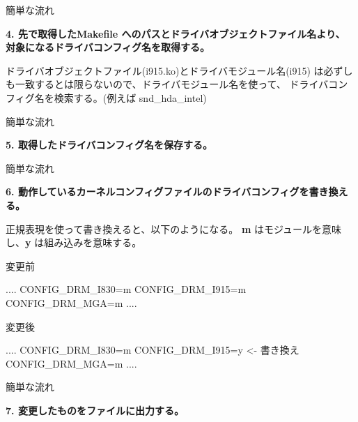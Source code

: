 \begin{frame}[containsverbatim]{簡単な流れ}

{\bf 4. 先で取得したMakefile へのパスとドライバオブジェクトファイル名より、
      対象になるドライバコンフィグ名を取得する。}

      ドライバオブジェクトファイル(i915.ko)とドライバモジュール名(i915)
      は必ずしも一致するとは限らないので、ドライバモジュール名を使って、
      ドライバコンフィグ名を検索する。(例えば snd\_hda\_intel)

\end{frame}

\begin{frame}[containsverbatim]{簡単な流れ}

{\bf 5. 取得したドライバコンフィグ名を保存する。}
\end{frame}

\begin{frame}[containsverbatim]{簡単な流れ}

{\bf 6. 動作しているカーネルコンフィグファイルのドライバコンフィグを書き換える。}

正規表現を使って書き換えると、以下のようになる。
{\bf m} はモジュールを意味し、{\bf y} は組み込みを意味する。

変更前
\begin{commandline0}
....
CONFIG_DRM_I830=m
CONFIG_DRM_I915=m
CONFIG_DRM_MGA=m
....
\end{commandline0}

変更後
\begin{commandline0}
....
CONFIG_DRM_I830=m
CONFIG_DRM_I915=y <- 書き換え
CONFIG_DRM_MGA=m
....
\end{commandline0}
\end{frame}

\begin{frame}[containsverbatim]{簡単な流れ}

{\bf 7. 変更したものをファイルに出力する。}

\end{frame}



